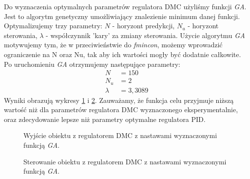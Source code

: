 Do wyznaczenia optymalnych parametrów regulatora DMC użyliśmy funkcji \emph{GA}. Jest to algorytm genetyczny umożliwiający znalezienie minimum danej funkcji. Optymalizujemy trzy parametry:
$N$ - horyzont predykcji,
$N_u$ - horyzont sterowania,
$\lambda$ - współczynnik 'kary' za zmiany sterowania.
Użycie algorytmu \emph{GA} motywujemy tym, że w przeciwieństwie do \emph{fmincon}, możemy wprowadzić ograniczenie na N oraz Nu, tak aby ich wartości mogły być dodatnie całkowite.
Po uruchomieniu \emph{GA} otrzymujemy następujące parametry:
\begin{align}
  N &= 150 \nonumber \\
  N_u &= 2 \\
  \lambda &= 3,3089 \nonumber
\end{align}
Wyniki obrazują wykresy \ref{fig:optim_dmc_out} i \ref{fig:optim_dmc_ster}.
Zauważamy, że funkcja celu przyjmuje niższą wartość niż dla parametrów regulatora DMC wyznaczonego eksperymentalnie, oraz zdecydowanie lepsze niż parametry optymalne regulatora PID.

\begin{figure}[tb]
\centering
{}
\caption{Wyjście obiektu z regulatorem DMC z nastawami wyznaczonymi funkcją \emph{GA}.}
\label{fig:optim_dmc_out}
\end{figure}

\begin{figure}[tb]
\centering
{}
\caption{Sterowanie obiektu z regulatorem DMC z nastawami wyznaczonymi funkcją \emph{GA}.}
\label{fig:optim_dmc_ster}
\end{figure}
